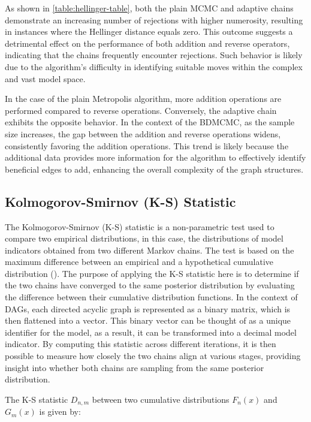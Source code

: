 \documentclass{report}
\begin{document}
As shown in \ref{table:hellinger-table}, both the plain MCMC and adaptive chains demonstrate an increasing number of rejections with higher numerosity, resulting in instances where the Hellinger distance equals zero. This outcome suggests a detrimental effect on the performance of both addition and reverse operators, indicating that the chains frequently encounter rejections. Such behavior is likely due to the algorithm's difficulty in identifying suitable moves within the complex and vast model space.

In the case of the plain Metropolis algorithm, more addition operations are performed compared to reverse operations. Conversely, the adaptive chain exhibits the opposite behavior.
In the context of the BDMCMC, as the sample size increases, the gap between the addition and reverse operations widens, consistently favoring the addition operations. This trend is likely because the additional data provides more information for the algorithm to effectively identify beneficial edges to add, enhancing the overall complexity of the graph structures.

\subsection{Kolmogorov-Smirnov (K-S) Statistic}

The Kolmogorov-Smirnov (K-S) statistic is a non-parametric test used to compare two empirical distributions, in this case, the distributions of model indicators obtained from two different Markov chains. The test is based on the maximum difference between an empirical and a hypothetical cumulative distribution (\citet{massey1951kolmogorov}).
The purpose of applying the K-S statistic here is to determine if the two chains have converged to the same posterior distribution by evaluating the difference between their cumulative distribution functions. In the context of DAGs, each directed acyclic graph is represented as a binary matrix, which is then flattened into a vector. This binary vector can be thought of as a unique identifier for the model, as a result, it can be transformed into a decimal model indicator. By computing this statistic across different iterations, it is then possible to measure how closely the two chains align at various stages, providing insight into whether both chains are sampling from the same posterior distribution.

The K-S statistic $D_{n,m}$ between two cumulative distributions $F_n (x)$ and $G_m (x)$ is given by:
\end{document}
